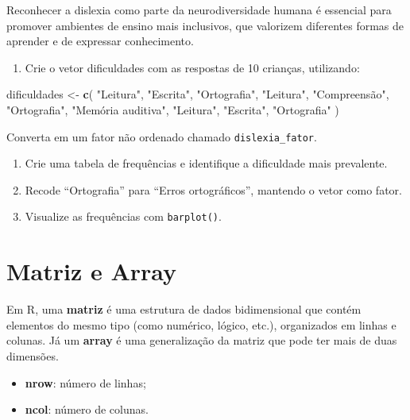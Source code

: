 \documentclass[
]{book}
\newenvironment{Shaded}{\begin{snugshade}}{\end{snugshade}}
\newcommand{\FunctionTok}[1]{\textcolor[rgb]{0.13,0.29,0.53}{\textbf{#1}}}
\newcommand{\NormalTok}[1]{#1}
\newcommand{\OtherTok}[1]{\textcolor[rgb]{0.56,0.35,0.01}{#1}}
\newcommand{\StringTok}[1]{\textcolor[rgb]{0.31,0.60,0.02}{#1}}
\providecommand{\tightlist}{%
  \setlength{\itemsep}{0pt}\setlength{\parskip}{0pt}}
\begin{document}
Reconhecer a dislexia como parte da neurodiversidade humana é essencial para promover ambientes de ensino mais inclusivos, que valorizem diferentes formas de aprender e de expressar conhecimento.

\begin{enumerate}
\def\labelenumi{(\alph{enumi})}
\tightlist
\item
  Crie o vetor dificuldades com as respostas de 10 crianças, utilizando:
\end{enumerate}

\begin{Shaded}
\begin{Highlighting}[]
\NormalTok{dificuldades }\OtherTok{\textless{}{-}} \FunctionTok{c}\NormalTok{(}
  \StringTok{"Leitura"}\NormalTok{, }\StringTok{"Escrita"}\NormalTok{, }\StringTok{"Ortografia"}\NormalTok{, }\StringTok{"Leitura"}\NormalTok{, }\StringTok{"Compreensão"}\NormalTok{,}
  \StringTok{"Ortografia"}\NormalTok{, }\StringTok{"Memória auditiva"}\NormalTok{, }\StringTok{"Leitura"}\NormalTok{, }\StringTok{"Escrita"}\NormalTok{, }\StringTok{"Ortografia"}
\NormalTok{)}
\end{Highlighting}
\end{Shaded}

Converta em um fator não ordenado chamado \texttt{dislexia\_fator}.

\begin{enumerate}
\def\labelenumi{(\alph{enumi})}
\setcounter{enumi}{1}
\item
  Crie uma tabela de frequências e identifique a dificuldade mais prevalente.
\item
  Recode ``Ortografia'' para ``Erros ortográficos'', mantendo o vetor como fator.
\item
  Visualize as frequências com \texttt{barplot()}.
\end{enumerate}

\section{Matriz e Array}\label{matriz-e-array}

Em R, uma \textbf{matriz} é uma estrutura de dados bidimensional que contém
elementos do mesmo tipo (como numérico, lógico, etc.), organizados em
linhas e colunas. Já um \textbf{array} é uma generalização da matriz que pode
ter mais de duas dimensões.

\begin{itemize}
\item
  \textbf{nrow}: número de linhas;
\item
  \textbf{ncol}: número de colunas.
\end{itemize}
\end{document}
